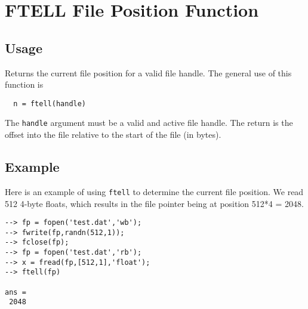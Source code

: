 \section{FTELL File Position Function}

\subsection{Usage}

Returns the current file position for a valid file handle.
The general use of this function is
\begin{verbatim}
  n = ftell(handle)
\end{verbatim}
The \verb|handle| argument must be a valid and active file handle.  The
return is the offset into the file relative to the start of the
file (in bytes).
\subsection{Example}

Here is an example of using \verb|ftell| to determine the current file 
position.  We read 512 4-byte floats, which results in the file 
pointer being at position 512*4 = 2048.
\begin{verbatim}
--> fp = fopen('test.dat','wb');
--> fwrite(fp,randn(512,1));
--> fclose(fp);
--> fp = fopen('test.dat','rb');
--> x = fread(fp,[512,1],'float');
--> ftell(fp)

ans = 
 2048 
\end{verbatim}

